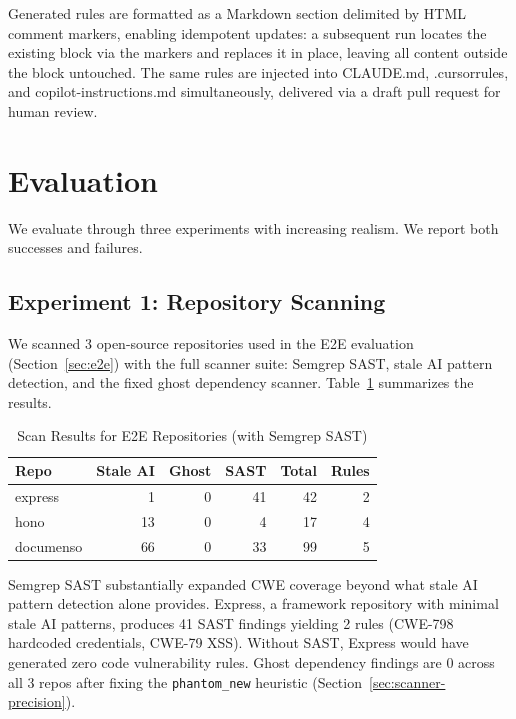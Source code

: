 \documentclass[conference,10pt]{IEEEtran}
\begin{document}
Generated rules are formatted as a Markdown section delimited by HTML comment markers, enabling idempotent updates: a subsequent run locates the existing block via the markers and replaces it in place, leaving all content outside the block untouched. The same rules are injected into CLAUDE.md, .cursorrules, and copilot-instructions.md simultaneously, delivered via a draft pull request for human review.

\section{Evaluation}

We evaluate through three experiments with increasing realism. We report both successes and failures.

\subsection{Experiment 1: Repository Scanning}

We scanned 3 open-source repositories used in the E2E evaluation (Section~\ref{sec:e2e}) with the full scanner suite: Semgrep SAST, stale AI pattern detection, and the fixed ghost dependency scanner. Table~\ref{tab:scan-results} summarizes the results.

\begin{table}[h]
\centering
\caption{Scan Results for E2E Repositories (with Semgrep SAST)}
\label{tab:scan-results}
\begin{tabular}{lrrrrr}
\toprule
\textbf{Repo} & \textbf{Stale AI} & \textbf{Ghost} & \textbf{SAST} & \textbf{Total} & \textbf{Rules} \\
\midrule
express & 1 & 0 & 41 & 42 & 2 \\
hono & 13 & 0 & 4 & 17 & 4 \\
documenso & 66 & 0 & 33 & 99 & 5 \\
\bottomrule
\end{tabular}
\end{table}

Semgrep SAST substantially expanded CWE coverage beyond what stale AI pattern detection alone provides. Express, a framework repository with minimal stale AI patterns, produces 41 SAST findings yielding 2 rules (CWE-798 hardcoded credentials, CWE-79 XSS). Without SAST, Express would have generated zero code vulnerability rules. Ghost dependency findings are 0 across all 3 repos after fixing the \texttt{phantom\_new} heuristic (Section~\ref{sec:scanner-precision}).
\end{document}
